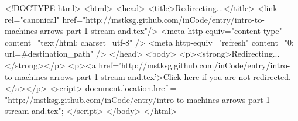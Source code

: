 <!DOCTYPE html>
<html>
<head>
<title>Redirecting...</title>
<link rel="canonical" href="http://mstksg.github.com/inCode/entry/intro-to-machines-arrows-part-1-stream-and.tex"/>
<meta http-equiv="content-type" content="text/html; charset=utf-8" />
<meta http-equiv="refresh" content="0; url=#{destination_path}" />
</head>
<body>
  <p><strong>Redirecting...</strong></p>
  <p><a href='http://mstksg.github.com/inCode/entry/intro-to-machines-arrows-part-1-stream-and.tex'>Click here if you are not redirected.</a></p>
  <script>
    document.location.href = "http://mstksg.github.com/inCode/entry/intro-to-machines-arrows-part-1-stream-and.tex";
  </script>
</body>
</html>

